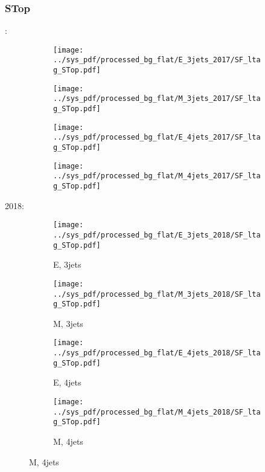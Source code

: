 \documentclass{beamer}
\begin{document}
\begin{frame}
\frametitle{STop}
\fontsize{5}{1}:
\begin{figure}
\centering
\begin{subfigure}[b]{0.24\textwidth}
\texttt{[image: ../sys\_pdf/processed\_bg\_flat/E\_3jets\_2017/SF\_ltag\_STop.pdf]}
\end{subfigure}
\begin{subfigure}[b]{0.24\textwidth}
\texttt{[image: ../sys\_pdf/processed\_bg\_flat/M\_3jets\_2017/SF\_ltag\_STop.pdf]}
\end{subfigure}
\begin{subfigure}[b]{0.24\textwidth}
\texttt{[image: ../sys\_pdf/processed\_bg\_flat/E\_4jets\_2017/SF\_ltag\_STop.pdf]}
\end{subfigure}
\begin{subfigure}[b]{0.24\textwidth}
\texttt{[image: ../sys\_pdf/processed\_bg\_flat/M\_4jets\_2017/SF\_ltag\_STop.pdf]}
\end{subfigure}
\end{figure}
2018:
\begin{figure}
\centering
\begin{subfigure}[b]{0.24\textwidth}
\texttt{[image: ../sys\_pdf/processed\_bg\_flat/E\_3jets\_2018/SF\_ltag\_STop.pdf]}
\captionsetup{font=tiny}
\caption{E, 3jets}
\end{subfigure}
\begin{subfigure}[b]{0.24\textwidth}
\texttt{[image: ../sys\_pdf/processed\_bg\_flat/M\_3jets\_2018/SF\_ltag\_STop.pdf]}
\captionsetup{font=tiny}
\caption{M, 3jets}
\end{subfigure}
\begin{subfigure}[b]{0.24\textwidth}
\texttt{[image: ../sys\_pdf/processed\_bg\_flat/E\_4jets\_2018/SF\_ltag\_STop.pdf]}
\captionsetup{font=tiny}
\caption{E, 4jets}
\end{subfigure}
\begin{subfigure}[b]{0.24\textwidth}
\texttt{[image: ../sys\_pdf/processed\_bg\_flat/M\_4jets\_2018/SF\_ltag\_STop.pdf]}
\captionsetup{font=tiny}
\caption{M, 4jets}
\end{subfigure}
\end{figure}
\end{frame}
\end{document}
